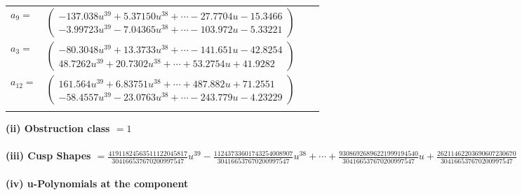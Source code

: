 \documentclass[1p]{elsarticle_modified}
\theoremstyle{definition}
\begin{document}
\begin{tabular}{m{7pt} m{180pt} m{7pt} m{180pt} }
\flushright $a_{9}=$&$\begin{pmatrix}-137.038 u^{39}+5.37150 u^{38}+\cdots-27.7704 u-15.3466\\-3.99723 u^{39}-7.04365 u^{38}+\cdots-103.972 u-5.33221\end{pmatrix}$ \\
\flushright $a_{3}=$&$\begin{pmatrix}-80.3048 u^{39}+13.3733 u^{38}+\cdots-141.651 u-42.8254\\48.7262 u^{39}+20.7302 u^{38}+\cdots+53.2754 u+41.9282\end{pmatrix}$ \\
\flushright $a_{12}=$&$\begin{pmatrix}161.564 u^{39}+6.83751 u^{38}+\cdots+487.882 u+71.2551\\-58.4557 u^{39}-23.0763 u^{38}+\cdots-243.779 u-4.23229\end{pmatrix}$\\&\end{tabular}
\flushleft \textbf{(ii) Obstruction class $= 1$}\\~\\
\flushleft \textbf{(iii) Cusp Shapes $= \frac{41911824563511122045817}{304166537670200997547} u^{39}-\frac{11243733601743254008907}{304166537670200997547} u^{38}+\cdots+\frac{93086926896221999194540}{304166537670200997547} u+\frac{26211462203690607230670}{304166537670200997547}$}\\~\\
\newpage\renewcommand{\arraystretch}{1}
\flushleft \textbf{(iv) u-Polynomials at the component}\newline \\
\end{document}
